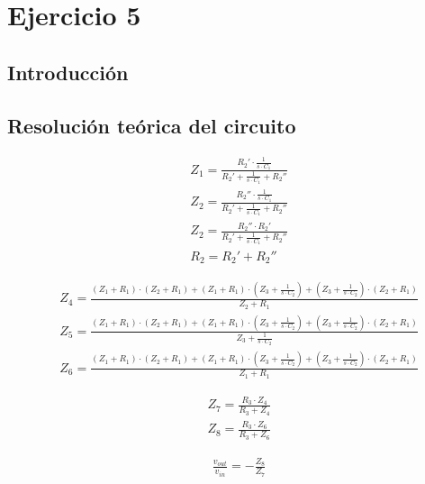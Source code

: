 \section{Ejercicio 5}
\subsection{Introducción}



\subsection{Resolución teórica del circuito}
\begin{align}
    &Z_1 = \frac{R_2' \cdot \frac{1}{s \cdot C_1}}{R_2' + \frac{1}{s \cdot C_1} + R_2''}  \label{eq:ej5_z1} \\
    &Z_2 = \frac{R_2'' \cdot \frac{1}{s \cdot C_1}}{R_2' + \frac{1}{s \cdot C_1} + R_2''}  \label{eq:ej5_z2} \\
    &Z_2 = \frac{R_2'' \cdot R_2'}{R_2' + \frac{1}{s \cdot C_1} + R_2''}  \label{eq:ej5_z3} \\
    &R_2 = R_2' + R_2'' \label{eq:ej5_r2}
\end{align}

\begin{align}
    &Z_4 = \frac{\left(Z_1 + R_1\right) \cdot \left(Z_2 + R_1\right) + \left(Z_1 + R_1\right) \cdot \left(Z_3 + \frac{1}{s \cdot C_2}\right) + \left(Z_3 + \frac{1}{s \cdot C_2}\right) \cdot \left(Z_2 + R_1\right)}{Z_2 + R_1}  \label{eq:ej5_z4} \\
    &Z_5 = \frac{\left(Z_1 + R_1\right) \cdot \left(Z_2 + R_1\right) + \left(Z_1 + R_1\right) \cdot \left(Z_3 + \frac{1}{s \cdot C_2}\right) + \left(Z_3 + \frac{1}{s \cdot C_2}\right) \cdot \left(Z_2 + R_1\right)}{Z_3 + \frac{1}{s \cdot C_2}}  \label{eq:ej5_z5} \\
    &Z_6 = \frac{\left(Z_1 + R_1\right) \cdot \left(Z_2 + R_1\right) + \left(Z_1 + R_1\right) \cdot \left(Z_3 + \frac{1}{s \cdot C_2}\right) + \left(Z_3 + \frac{1}{s \cdot C_2}\right) \cdot \left(Z_2 + R_1\right)}{Z_1 + R_1}  \label{eq:ej5_z6}
\end{align}

\begin{align}
    &Z_7 = \frac{R_3 \cdot Z_4}{R_3 + Z_4} \label{eq:ej5_z7} \\
    &Z_8 = \frac{R_3 \cdot Z_6}{R_3 + Z_6} \label{eq:ej5_z8}
\end{align}

\begin{align}
    &\frac{v_{out}}{v_{in}} = - \frac{Z_8}{Z_7}
\end{align}

